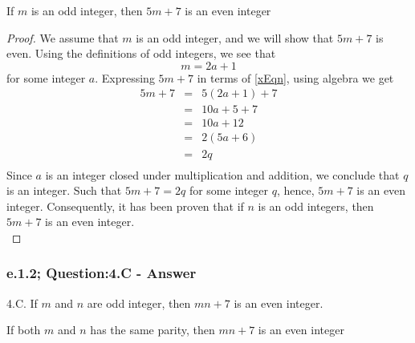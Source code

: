 \begin{tcolorbox}
\begin{theorem}
If $m$ is an odd integer, then $5m + 7$ is an even integer
\end{theorem}
\end{tcolorbox}

\begin{proof}
We assume that $m$ is an odd integer, and we will show that $5m + 7$ is even. Using the definitions of odd integers, we see that
\begin{equation}
\label{xEqn}
m = 2a + 1
\end{equation}
for some integer $a$. Expressing $5m + 7$ in terms of \ref{xEqn}, using algebra we get
\begin{eqnarray*}
5m + 7 & = & 5(2a + 1) + 7  \nonumber \\
& = & 10a + 5 + 7 \nonumber \\
& = & 10a + 12 \nonumber \\
& = & 2(5a + 6) \nonumber \\
& = & 2q \nonumber \\
\end{eqnarray*}
Since $a$ is an integer closed under multiplication and addition, we conclude that $q$ is an integer. Such that $5m + 7 = 2q$ for some integer $q$, hence, $5m + 7$ is an even integer. Consequently, it has been proven that if $n$ is an odd integers, then $5m + 7$ is an even integer. \\
\end{proof}



\subsubsection*{e.1.2; Question:4.C - Answer}
4.C. If $m$ and $n$ are odd integer, then $mn + 7$ is an even integer. \\

\begin{tcolorbox}
\begin{theorem}
If both $m$ and $n$ has the same parity, then $mn + 7$ is an even integer
\end{theorem}
\end{tcolorbox}


